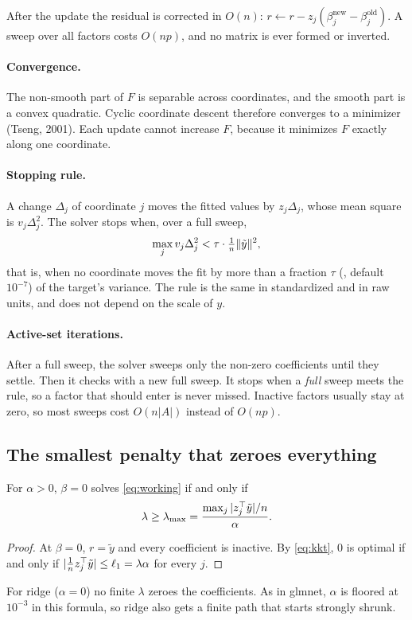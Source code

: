\documentclass[11pt,a4paper]{article}
\begin{document}
After the update the residual is corrected in $O(n)$: $r\leftarrow r-z_j(\beta_j^{\text{new}}-\beta_j^{\text{old}})$.
A sweep over all factors costs $O(np)$, and no matrix is ever formed or inverted.

\paragraph{Convergence.} The non-smooth part of $F$ is separable across coordinates, and the
smooth part is a convex quadratic. Cyclic coordinate descent therefore converges to a
minimizer (Tseng, 2001). Each update cannot increase $F$, because it minimizes $F$
exactly along one coordinate.

\paragraph{Stopping rule.} A change $\Delta_j$ of coordinate $j$ moves the fitted values by
$z_j\Delta_j$, whose mean square is $v_j\Delta_j^2$. The solver stops when, over a full
sweep,
\[
  \max_jv_j\Delta_j^2<\tau\cdot\tfrac1n\lVert \tilde y\rVert^2,
\]
that is, when no coordinate moves the fit by more than a fraction $\tau$ (,
default $10^{-7}$) of the target's variance. The rule is the same in standardized and in
raw units, and does not depend on the scale of $y$.

\paragraph{Active-set iterations.} After a full sweep, the solver sweeps only the non-zero
coefficients until they settle. Then it checks with a new full sweep. It stops when a
\emph{full} sweep meets the rule, so a factor that should enter is never missed. Inactive
factors usually stay at zero, so most sweeps cost $O(n|A|)$ instead of $O(np)$.

\subsection{The smallest penalty that zeroes everything}

\begin{proposition}[$\lambda_{\max}$]\label{prop:lmax}
For $\alpha>0$, $\beta=0$ solves \eqref{eq:working} if and only if
\[
  \lambda\ge\lambda_{\max}=\frac{\max_j|z_j^\top\tilde y|/n}{\alpha}.
\]
\end{proposition}
\begin{proof}
At $\beta=0$, $r=\tilde y$ and every coefficient is inactive. By \eqref{eq:kkt}, $0$ is optimal
if and only if $|\frac1nz_j^\top\tilde y|\le\ell_1=\lambda\alpha$ for every $j$.
\end{proof}
For ridge ($\alpha=0$) no finite $\lambda$ zeroes the coefficients. As in glmnet, $\alpha$ is
floored at $10^{-3}$ in this formula, so ridge also gets a finite path that starts strongly
shrunk.
\end{document}
